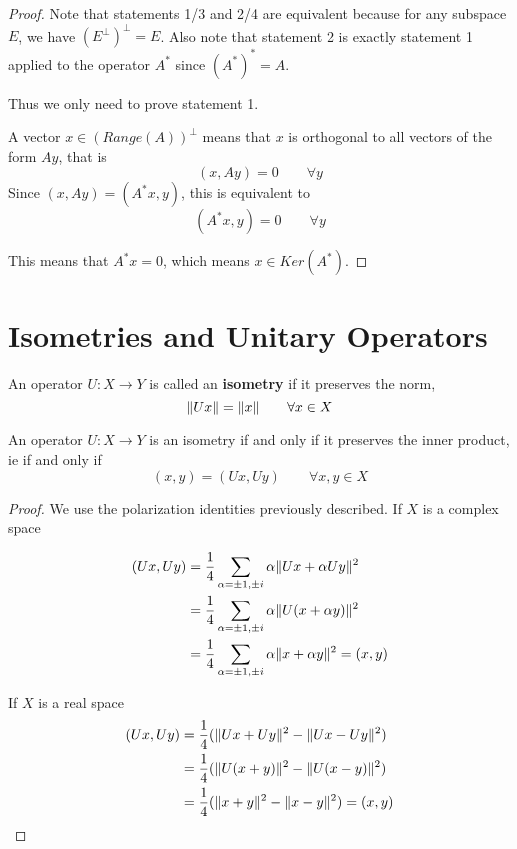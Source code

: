 \begin{proof}
Note that statements 1/3 and 2/4 are equivalent because for any subspace $E$, we have $(E^{\perp})^{\perp} = E$. Also note that statement 2 is exactly statement 1 applied to the operator $A^{*}$ since $(A^{*})^{*} = A$. 

Thus we only need to prove statement 1. 

A vector $x \in (Range(A))^{\perp}$ means that $x$ is orthogonal to all vectors of the form $Ay$, that is 
$$(x, Ay) = 0 \qquad \forall y$$ 
Since $(x, Ay) = (A^{*}x, y)$, this is equivalent to 
$$(A^{*} x, y) = 0 \qquad \forall y$$

This means that $A^{*}x = 0$, which means $x \in Ker(A^{*})$. 
\end{proof}

\section{Isometries and Unitary Operators}
\begin{definition}
An operator $U: X \rightarrow Y$ is called an \textbf{isometry} if it preserves the norm, 
$$\lVert Ux\rVert = \lVert x\rVert \qquad \forall x \in X$$
\end{definition}

\begin{theorem}
An operator $U: X \rightarrow Y$ is an isometry if and only if it preserves the inner product, ie if and only if 
$$(x, y) = (Ux, Uy) \qquad \forall x, y \in X$$
\end{theorem}

\begin{proof}
We use the polarization identities previously described. If $X$ is a complex space

$$
\begin{aligned}
(Ux, Uy) &= \frac{1}{4} \sum_{\alpha = \pm 1, \pm i} \alpha \lVert Ux + \alpha Uy\rVert^{2} \\ 
&= \frac{1}{4} \sum_{\alpha = \pm 1, \pm i} \alpha \lVert U(x + \alpha y)\rVert^{2} \\
&= \frac{1}{4} \sum_{\alpha = \pm 1, \pm i} \alpha \lVert x + \alpha y\rVert^{2} = (x, y)
\end{aligned}
$$

If $X$ is a real space 
$$\begin{aligned} 
(Ux, Uy) &= \frac{1}{4}(\lVert Ux + Uy\rVert^{2} - \lVert Ux - Uy\rVert^{2}) \\
&= \frac{1}{4} (\lVert U(x + y)\rVert^{2} - \lVert U(x - y)\rVert^{2}) \\
&= \frac{1}{4} (\lVert x + y\rVert^{2} - \lVert x - y\rVert^{2}) = (x, y)
\end{aligned}
$$
\end{proof}

